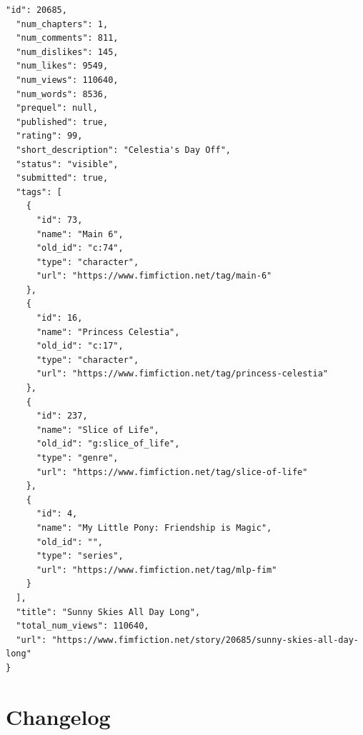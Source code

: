 \documentclass[hidelinks,a4paper,12pt]{article}
\begin{document}
\begin{lstlisting}[breaklines, basicstyle=\ttfamily\small, columns=flexible]
  "id": 20685,
  "num_chapters": 1,
  "num_comments": 811,
  "num_dislikes": 145,
  "num_likes": 9549,
  "num_views": 110640,
  "num_words": 8536,
  "prequel": null,
  "published": true,
  "rating": 99,
  "short_description": "Celestia's Day Off",
  "status": "visible",
  "submitted": true,
  "tags": [
    {
      "id": 73,
      "name": "Main 6",
      "old_id": "c:74",
      "type": "character",
      "url": "https://www.fimfiction.net/tag/main-6"
    },
    {
      "id": 16,
      "name": "Princess Celestia",
      "old_id": "c:17",
      "type": "character",
      "url": "https://www.fimfiction.net/tag/princess-celestia"
    },
    {
      "id": 237,
      "name": "Slice of Life",
      "old_id": "g:slice_of_life",
      "type": "genre",
      "url": "https://www.fimfiction.net/tag/slice-of-life"
    },
    {
      "id": 4,
      "name": "My Little Pony: Friendship is Magic",
      "old_id": "",
      "type": "series",
      "url": "https://www.fimfiction.net/tag/mlp-fim"
    }
  ],
  "title": "Sunny Skies All Day Long",
  "total_num_views": 110640,
  "url": "https://www.fimfiction.net/story/20685/sunny-skies-all-day-long"
}
\end{lstlisting}


\section{Changelog} \label{sec:changelog}
\end{document}
